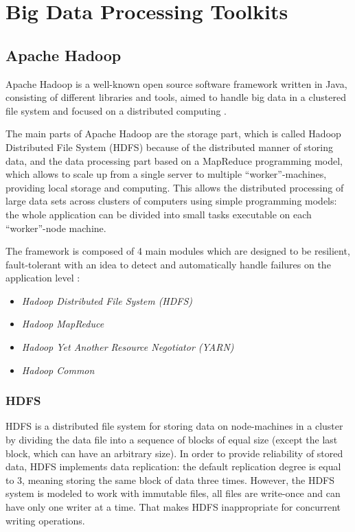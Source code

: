 \section{Big Data Processing Toolkits}


\subsection{Apache Hadoop}

Apache Hadoop is a well-known open source software framework written in Java, consisting of different libraries and tools, aimed to handle big data in a clustered file system and focused on a distributed computing \cite{online:apache_hadoop}. 

The main parts of Apache Hadoop are the storage part, which is called Hadoop Distributed File System (HDFS) because of the distributed manner of storing data, and the data processing part based on a MapReduce programming model, which allows to scale up from a single server to multiple ``worker''-machines, providing local storage and computing. This allows the distributed processing of large data sets across clusters of computers using simple programming models: the whole application can be divided into small tasks executable on each ``worker''-node machine.

The framework is composed of 4 main modules which are designed to be resilient, fault-tolerant with an idea to detect and automatically handle failures on the application level \cite{online:apache_hadoop}:
\begin{itemize}
	\item \textit{Hadoop Distributed File System (HDFS)}
	\item \textit{Hadoop MapReduce}
	\item \textit{Hadoop Yet Another Resource Negotiator (YARN)}
	\item \textit{Hadoop Common}
\end{itemize}

\subsubsection{HDFS}
HDFS is a distributed file system for storing data on node-machines in a cluster by dividing the data file into a sequence of blocks of equal size (except the last block, which can have an arbitrary size). In order to provide reliability of stored data, HDFS implements data replication: the default replication degree is equal to 3, meaning storing the same block of data three times. However, the HDFS system is modeled to work with immutable files, all files are write-once and can have only one writer at a time. That makes HDFS inappropriate for concurrent writing operations.

